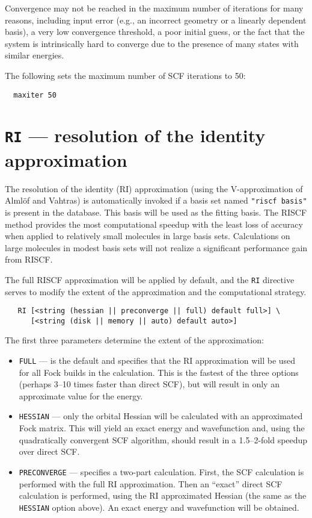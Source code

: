 \fussy

Convergence may not be reached in the maximum number of iterations for
many reasons, including input error (e.g., an incorrect geometry or a
linearly dependent basis), a very low convergence threshold, a poor
initial guess, or the fact that the system is intrinsically hard to
converge due to the presence of many states with similar energies.

The following sets the maximum number of SCF iterations to 50:
\begin{verbatim}
  maxiter 50
\end{verbatim}

\section{{\tt RI} --- resolution of the identity approximation}
\label{sec:riscf}

The resolution of the identity (RI) approximation (using the
V-approximation of Alml\"{o}f and Vahtras) is automatically invoked if
a basis set named \verb+"riscf basis"+ is present in the database.
This basis will be used as the fitting basis.  The RISCF method
provides the most computational speedup with the least loss of
accuracy when applied to relatively small molecules in large basis
sets.  Calculations on large molecules in modest basis sets will not
realize a significant performance gain from RISCF.

The full RISCF approximation will be applied by default, and the
\verb+RI+ directive serves to modify the extent of the approximation
and the computational strategy.

\begin{verbatim}
   RI [<string (hessian || preconverge || full) default full>] \
      [<string (disk || memory || auto) default auto>]
\end{verbatim}

The first three parameters determine the extent of the approximation:
\begin{itemize} 
\item \verb+FULL+ --- is the default and specifies that the RI
  approximation will be used for all Fock builds in the calculation.
  This is the fastest of the three options (perhaps 3--10 times faster
  than direct SCF), but will result in only an approximate value for
  the energy.

\item \verb+HESSIAN+ --- only the orbital Hessian will be calculated
  with an approximated Fock matrix.  This will yield an exact energy
  and wavefunction and, using the quadratically convergent SCF
  algorithm, should result in a 1.5--2-fold speedup over direct SCF.

\item \verb+PRECONVERGE+ --- specifies a two-part calculation.  First,
  the SCF calculation is performed with the full RI
  approximation.  Then an ``exact'' direct SCF calculation is performed, 
using the RI approximated Hessian (the same as the 
  \verb+HESSIAN+ option above).  An exact energy and wavefunction will be
  obtained.
\end{itemize}

